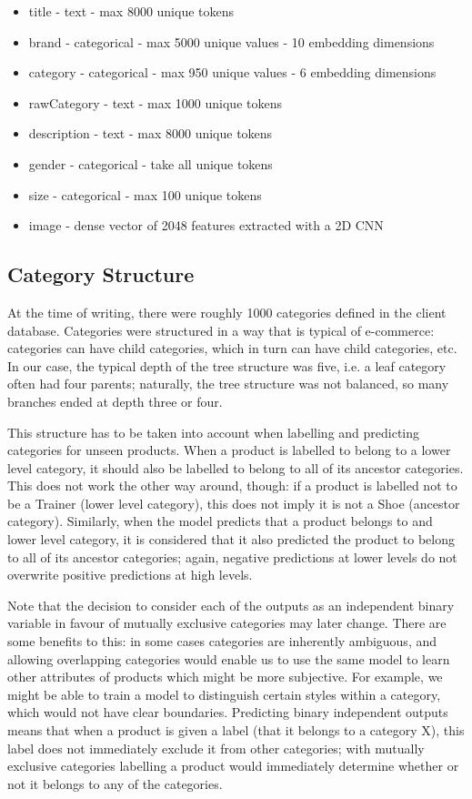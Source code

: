 \begin{itemize}[noitemsep]
  \item title - text - max 8000 unique tokens
  \item brand - categorical - max 5000 unique values - 10 embedding dimensions
  \item category - categorical - max 950 unique values - 6 embedding dimensions
  \item rawCategory - text - max 1000 unique tokens
  \item description - text - max 8000 unique tokens
  \item gender - categorical - take all unique tokens
  \item size - categorical - max 100 unique tokens
  \item image - dense vector of 2048 features extracted with a 2D CNN
\end{itemize}

\subsection{Category Structure}
\label{cat_tree}

At the time of writing, there were roughly 1000 categories defined in the client database.
Categories were structured in a way that is typical of  e-commerce:  categories can have  child categories, which in turn can have child categories, etc.
In our case, the typical depth of the tree structure was five, i.e. a leaf category often had four parents;  naturally, the tree structure was not balanced, so many branches ended at depth three or four.

This structure has to be taken into account when labelling and  predicting categories for unseen products.
When a product is labelled to belong to a  lower level category,  it should also be labelled to belong to all of its ancestor categories. This does not work the other way around, though:  if a product is labelled not to be a Trainer (lower level category),  this does not imply it is not a Shoe (ancestor category).
Similarly, when the model predicts that a product belongs to and  lower level category, it is considered that it also predicted the product to belong to all of its  ancestor categories;  again, negative predictions at lower levels do not  overwrite positive predictions at high levels.

Note that the decision to consider each of the outputs as an independent binary variable in favour of mutually exclusive categories may later change.
There are some benefits to this: in some cases categories are inherently ambiguous, and allowing overlapping categories would enable us to use the same model to learn other attributes of products which might be more subjective.
For example, we might be able to train a model to distinguish certain styles within a category, which would not have clear boundaries.
Predicting binary independent outputs means that when a product is given a label (that it belongs to a category X),  this label does not immediately  exclude it from other categories;  with mutually exclusive categories labelling a product  would immediately determine whether or not it belongs to any of the categories.

